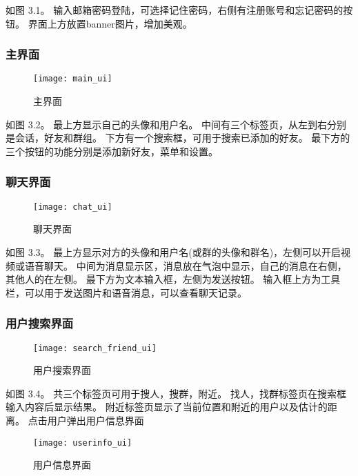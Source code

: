 如图 3.1。
输入邮箱密码登陆，可选择记住密码，右侧有注册账号和忘记密码的按钮。
界面上方放置banner图片，增加美观。

\clearpage
\subsubsection{主界面}
\begin{figure}[h]
	\centering
	\texttt{[image: main\_ui]}
	\caption{主界面} \label{fig:main_ui}
\end{figure}

如图 3.2。
最上方显示自己的头像和用户名。
中间有三个标签页，从左到右分别是会话，好友和群组。
下方有一个搜索框，可用于搜索已添加的好友。
最下方的三个按钮的功能分别是添加新好友，菜单和设置。

\clearpage
\subsubsection{聊天界面}
\begin{figure}[h]
	\centering
	\texttt{[image: chat\_ui]}
	\caption{聊天界面} \label{fig:chat_ui}
\end{figure}


如图 3.3。
最上方显示对方的头像和用户名(或群的头像和群名)，左侧可以开启视频或语音聊天。
中间为消息显示区，消息放在气泡中显示，自己的消息在右侧，其他人的在左侧。
最下方为文本输入框，左侧为发送按钮。
输入框上方为工具栏，可以用于发送图片和语音消息，可以查看聊天记录。

\subsubsection{用户搜索界面}
\begin{figure}[h]
	\centering
	\texttt{[image: search\_friend\_ui]}
	\caption{用户搜索界面} \label{fig:search_friend_ui}
\end{figure}

如图 3.4。
共三个标签页可用于搜人，搜群，附近。
找人，找群标签页在搜索框输入内容后显示结果。
附近标签页显示了当前位置和附近的用户以及估计的距离。
点击用户弹出用户信息界面

\begin{figure}[ht]
	\centering
	\texttt{[image: userinfo\_ui]}
	\caption{用户信息界面} \label{fig:userinfo_ui}
\end{figure}


